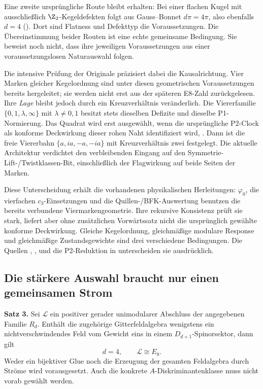 Eine zweite ursprüngliche Route bleibt erhalten: Bei einer flachen Kugel mit ausschließlich $\Z_2$-Kegeldefekten folgt aus Gauss--Bonnet $d\pi=4\pi$, also ebenfalls $d=4$ (). Dort sind Flatness und Defekttyp die Voraussetzungen. Die Übereinstimmung beider Routen ist eine echte gemeinsame Bedingung. Sie beweist noch nicht, dass ihre jeweiligen Voraussetzungen aus einer voraussetzungslosen Naturauswahl folgen.

Die intensive Prüfung der Originale präzisiert dabei die Kausalrichtung. Vier Marken gleicher Kegelordnung sind unter diesen geometrischen Voraussetzungen bereits hergeleitet; sie werden nicht erst aus der späteren E8-Zahl zurückgelesen. Ihre \emph{Lage} bleibt jedoch durch ein Kreuzverhältnis veränderlich. Die Viererfamilie $\{0,1,\lambda,\infty\}$ mit $\lambda\ne0,1$ besitzt stets dieselben Defizite und dieselbe P1-Normierung. Das Quadrat wird erst ausgewählt, wenn die ursprüngliche P2-Clock als konforme Deckwirkung dieser rohen Naht identifiziert wird, . Dann ist die freie Viererbahn $\{a,ia,-a,-ia\}$ mit Kreuzverhältnis zwei festgelegt. Die aktuelle Architektur verdichtet den verbleibenden Eingang auf den Symmetrie-Lift-/Twistklassen-Bit, einschließlich der Flagwirkung auf beide Seiten der Marken.

Diese Unterscheidung erhält die vorhandenen physikalischen Herleitungen: $\varphi_0$, die vierfachen $c_3$-Einsetzungen und die Quillen-/BFK-Auswertung benutzen die bereits verbundene Viermarkengeometrie. Ihre rekursive Konsistenz prüft sie stark, liefert aber ohne zusätzlichen Vorwärtssatz nicht die ursprünglich gewählte konforme Deckwirkung. Gleiche Kegelordnung, gleichmäßige modulare Response und gleichmäßige Zustandsgewichte sind drei verschiedene Bedingungen. Die Quellen , ,  und die P2-Reduktion in  unterscheiden sie ausdrücklich.

\subsection{Die stärkere Auswahl braucht nur einen gemeinsamen Strom}\label{sec:onespinorcurrent}

\textbf{Satz 3.} Sei $\mathcal L$ ein positiver gerader unimodularer Abschluss der angegebenen Familie $R_d$. Enthält die zugehörige Gitterfeldalgebra wenigstens ein nichtverschwindendes Feld vom Gewicht eins in einem $D_{d+1}$-Spinorsektor, dann gilt
\begin{equation}\label{eq:onespinorselector}
 \boxed{d=4,\qquad \mathcal L\cong E_8.}
\end{equation}
Weder ein bijektiver Glue noch die Erzeugung der gesamten Feldalgebra durch Ströme wird vorausgesetzt. Auch die konkrete $A$-Diskriminantenklasse muss nicht vorab gewählt werden.

